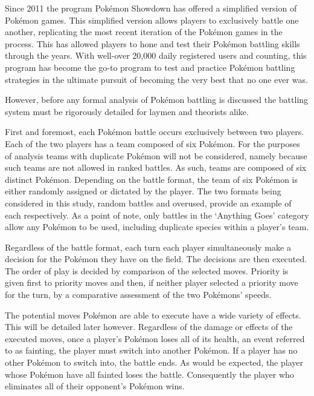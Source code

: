 \documentclass[12pt,twoside]{reedthesis}
\begin{document}
  Since 2011 the program Pokémon Showdown has offered a simplified version
  of Pokémon games. This simplified version allows players to exclusively
  battle one another, replicating the most recent iteration of the Pokémon
  games in the process. This has allowed players to hone and test their
  Pokémon battling skills through the years. With well-over 20,000 daily
  registered users and counting, this program has become the go-to program
  to test and practice Pokémon battling strategies in the ultimate pursuit
  of becoming the very best that no one ever was.
  
  However, before any formal analysis of Pokémon battling is discussed the
  battling system must be rigorously detailed for laymen and theorists
  alike.
  
  First and foremost, each Pokémon battle occurs exclusively between two
  players. Each of the two players has a team composed of six Pokémon. For
  the purposes of analysis teams with duplicate Pokémon will not be
  considered, namely because such teams are not allowed in ranked battles.
  As such, teams are composed of six distinct Pokémon. Depending on the
  battle format, the team of six Pokémon is either randomly assigned or
  dictated by the player. The two formats being considered in this study,
  random battles and overused, provide an example of each respectively. As
  a point of note, only battles in the `Anything Goes' category allow any
  Pokémon to be used, including duplicate species within a player's team.
  
  Regardless of the battle format, each turn each player simultaneously
  make a decision for the Pokémon they have on the field. The decisions
  are then executed. The order of play is decided by comparison of the
  selected moves. Priority is given first to priority moves and then, if
  neither player selected a priority move for the turn, by a comparative
  assessment of the two Pokémons' speeds.
  
  The potential moves Pokémon are able to execute have a wide variety of
  effects. This will be detailed later however. Regardless of the damage
  or effects of the executed moves, once a player's Pokémon loses all of
  its health, an event referred to as fainting, the player must switch
  into another Pokémon. If a player has no other Pokémon to switch into,
  the battle ends. As would be expected, the player whose Pokémon have all
  fainted loses the battle. Consequently the player who eliminates all of
  their opponent's Pokémon wins.
  
\end{document}
